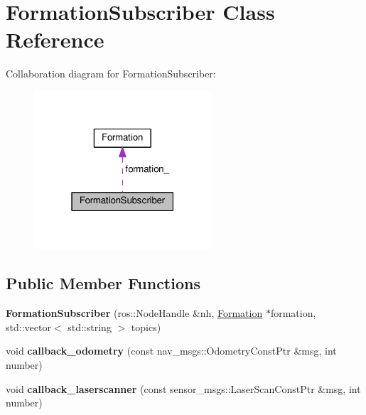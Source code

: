 \hypertarget{classFormationSubscriber}{}\section{Formation\+Subscriber Class Reference}
\label{classFormationSubscriber}


Collaboration diagram for Formation\+Subscriber\+:\nopagebreak
\begin{figure}[H]
\begin{center}
\leavevmode
\includegraphics[width=187pt]{classFormationSubscriber__coll__graph}
\end{center}
\end{figure}
\subsection*{Public Member Functions}
\begin{DoxyCompactItemize}
\item 
{\bfseries Formation\+Subscriber} (ros\+::\+Node\+Handle \&nh, \hyperlink{classFormation}{Formation} $\ast$formation, std\+::vector$<$ std\+::string $>$ topics)\hypertarget{classFormationSubscriber_ab691695d88dd33de83c5a1a6688cc0df}{}\label{classFormationSubscriber_ab691695d88dd33de83c5a1a6688cc0df}

\item 
void {\bfseries callback\+\_\+odometry} (const nav\+\_\+msgs\+::\+Odometry\+Const\+Ptr \&msg, int number)\hypertarget{classFormationSubscriber_ad321467ea2f6538f7ee9c6fc233438d0}{}\label{classFormationSubscriber_ad321467ea2f6538f7ee9c6fc233438d0}

\item 
void {\bfseries callback\+\_\+laserscanner} (const sensor\+\_\+msgs\+::\+Laser\+Scan\+Const\+Ptr \&msg, int number)\hypertarget{classFormationSubscriber_a1eb720d4ce3016eb21cac0f33296eeae}{}\label{classFormationSubscriber_a1eb720d4ce3016eb21cac0f33296eeae}

\end{DoxyCompactItemize}
